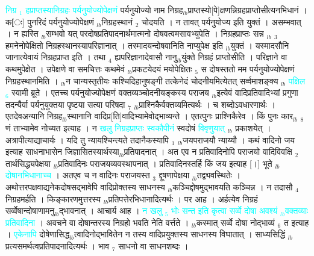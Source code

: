 \documentclass[article,12pt,a4paper]{memoir}%
\newcommand{\quotelemma}[1]{\textcolor{cyan}{#1}}
\begin{document}
	  
	  \pstart \leavevmode%
	\hphantom{.}\quotelemma{निग्र {\tiny $_{1}$} हप्राप्तस्यानिग्रहः पर्यनुयोज्योपेक्षणं} \cite[18b9]{vn-msN} पर्यनुयोज्यो नाम निग्रह{\tiny $_{lb}$}प्राप्तस्यो[पे]क्षणन्निग्रहप्राप्तोसीत्यनभिधानं । क[ः] पुनरिदं पर्यनुयोज्योपेक्षणं {\tiny $_{lb}$}निग्रहस्थानं {\tiny $_{2}$} चोदयति । न तावत् पर्यनुयोज्य इति युक्तं । असम्भवात् । न ह्यस्ति {\tiny $_{lb}$}सम्भवो यत् परदोषप्रतिपादनार्थमात्मनो दोषवत्वमसावभ्युपेति । निग्रहप्राप्तः सन्न {\tiny $_{lb}$} \leavevmode{} {\tiny $_{3}$} हमनेनोपेक्षितो निग्रहस्थानस्यापरिज्ञानात् । तस्मादयन्दोषवानिति नाप्युपेक्ष इति {\tiny $_{lb}$}युक्तं । यस्मादसौनि जानात्येवायं निग्रहप्राप्त इति । तथा {\tiny $_{4}$} ह्यपरिज्ञानादेवासौ नानु{\tiny $_{lb}$}युंक्ते निग्रहं प्राप्तोसीति । परिज्ञाने वा कथमुपेक्षेत । उपेक्षणे वा समचित्तः कथमेवं {\tiny $_{lb}$}प्रकटयेदयं मयोपेक्षितः {\tiny $_{5}$} स दोषस्ततो मम पर्यनुयोज्योपेक्षणं निग्रहस्थानमिति । {\tiny $_{lb}$}न चान्यस्तृतीयः कश्चिदिहानुषङ्गी तत्केनेदं चोदनीयमित्येतत् सर्व्वमाशङ्क्य {\tiny $_{lb}$} \quotelemma{पक्षिल {\tiny $_{6}$}} स्वामी ब्रूते । एतच्च पर्यनुयोज्योपेक्षणं वक्तव्यञ्चोदनीयङ्कस्य पराजय {\tiny $_{lb}$}इत्येवं वादिप्रतिवादिभ्यां प्रगुणा तदन्यैर्वा पर्यनुयुक्तया पृष्टया सत्या परिषदा {\tiny $_{7}$} {\tiny $_{lb}$}प्राश्निकैर्वक्तव्यमित्यर्थः । च शब्दोऽवधारणार्थः । एतदेवअन्यानि निग्रह{\tiny $_{lb}$}स्थानानि वादिप्र[ति]वादिभ्यामेवोद्भाव्यन्ते । एतत्पुनः प्राश्निकैरेव । किं पुनः कार{\tiny $_{lb}$} {\tiny $_{8}$} \leavevmode{} णं ताभ्यामेव नोच्यत इत्याह । न \quotelemma{खलु निग्रहप्राप्तः स्वकौपीनं} स्वदोषं \quotelemma{विवृणुयात्} {\tiny $_{lb}$} \cite[18b10]{vn-msN} प्रकाशयेत् । अत्रापीत्याद्याचार्यः । यदि तु न्यायश्चिन्त्यते तदानैकस्यापि {\tiny $_{1}$} {\tiny $_{lb}$}जयपराजयौ न्याय्यौ । कथं वादिनो जय इत्याह साधनाभासेन जिज्ञासितस्यार्थस्या{\tiny $_{lb}$}प्रतिपादनात् । अत एव न प्रतिवादिनोपि पराजयो वादिविवक्षि {\tiny $_{2}$} तार्थसिद्ध्यपेक्षया {\tiny $_{lb}$}प्रतिवादिनः पराजयव्यवस्थापनात् । प्रतिवादिनस्तर्हि किं जय इत्याह [।] भूते {\tiny $_{lb}$} \quotelemma{दोषानभिधानाच्च} \cite[19a1]{vn-msN} । अतएव च न वादिनः पराजयस्त {\tiny $_{3}$} द्दूषणापेक्षया {\tiny $_{lb}$}तद्व्यवस्थितेः । अथोत्तरपक्षवाद्यनेकदोषसद्भावेपि वादिप्रोक्तस्य साधनस्य {\tiny $_{lb}$}कञ्चिद्दोषमुद्भावयति कञ्चिन्न । न तदासौ {\tiny $_{4}$} निग्रहमर्हति । किङ्कारणमुत्तरस्य {\tiny $_{lb}$}प्रतिपत्तेरभिधानादित्यर्थः । पर आह । अर्हत्येव निग्रहं सर्व्वेषान्दोषाणामनु{\tiny $_{lb}$}द्भावनात् । आचार्य आह । \quotelemma{न खलु {\tiny $_{5}$} भोः सन्त इति कृत्वा सर्व्वे दोषा अवश्यं {\tiny $_{lb}$}वक्तव्याः प्रतिवादिना} । अवचने वा दोषान्तरस्य निग्रहो भवति नेति वर्त्तते । {\tiny $_{lb}$}कस्मात् सर्व्वे दोषा नोद्भाव्यं {\tiny $_{6}$} त इत्याह । \quotelemma{एकेनापि} \cite[19a2]{vn-msN} दोषेणासिद्ध{\tiny $_{lb}$}त्वादिनोद्भावितेन न तस्य वादिप्रयुक्तस्य साधनस्य विघातात् । साध्यसिद्धिं {\tiny $_{lb}$}प्रत्यसमर्थत्वप्रतिपादनादित्यर्थः । भाव {\tiny $_{7}$} साधनो वा साधनशब्दः । 
\end{document}
